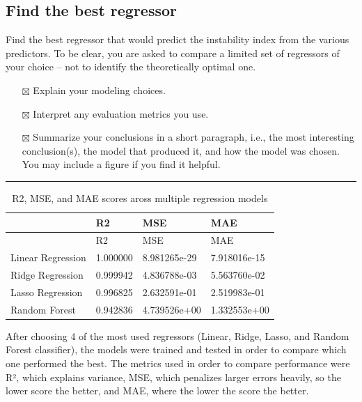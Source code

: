\documentclass[
  letterpaper,
  DIV=11,
  numbers=noendperiod]{scrartcl}
\providecommand{\tightlist}{%
  \setlength{\itemsep}{0pt}\setlength{\parskip}{0pt}}\usepackage{longtable,booktabs,array}
\begin{document}
\subsection{Find the best regressor}\label{find-the-best-regressor}

Find the best regressor that would predict the instability index from
the various predictors. To be clear, you are asked to compare a limited
set of regressors of your choice -- not to identify the theoretically
optimal one.

\begin{itemize}
\tightlist
\item[$\boxtimes$]
  Explain your modeling choices.
\item[$\boxtimes$]
  Interpret any evaluation metrics you use.
\item[$\boxtimes$]
  Summarize your conclusions in a short paragraph, i.e., the most
  interesting conclusion(s), the model that produced it, and how the
  model was chosen. You may include a figure if you find it helpful.
\end{itemize}

\begin{center}\rule{0.5\linewidth}{0.5pt}\end{center}

\label{best-regressor}
\begin{longtable}[]{@{}llll@{}}
\caption{R2, MSE, and MAE scores aross multiple regression
models}\tabularnewline
\toprule\noalign{}
& R2 & MSE & MAE \\
\midrule\noalign{}
\endfirsthead
\toprule\noalign{}
& R2 & MSE & MAE \\
\midrule\noalign{}
\endhead
\bottomrule\noalign{}
\endlastfoot
Linear Regression & 1.000000 & 8.981265e-29 & 7.918016e-15 \\
Ridge Regression & 0.999942 & 4.836788e-03 & 5.563760e-02 \\
Lasso Regression & 0.996825 & 2.632591e-01 & 2.519983e-01 \\
Random Forest & 0.942836 & 4.739526e+00 & 1.332553e+00 \\
\end{longtable}

After choosing 4 of the most used regressors (Linear, Ridge, Lasso, and
Random Forest classifier), the models were trained and tested in order
to compare which one performed the best. The metrics used in order to
compare performance were R², which explains variance, MSE, which
penalizes larger errors heavily, so the lower score the better, and MAE,
where the lower the score the better.
\end{document}
